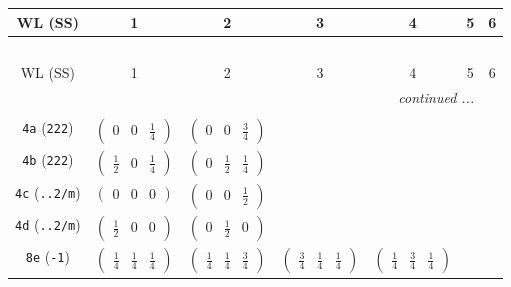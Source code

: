\documentclass[fleqn,9pt,landscape]{jsarticle}
\begin{document}
\begin{center}
\renewcommand{\arraystretch}{1.2}
\begin{longtable}{ccccccc}
 \hline \hline
WL (SS) & 1 & 2 & 3 & 4 & 5 & 6 \\ \hline \endfirsthead

\multicolumn{6}{l}{\tablename\ \thetable{}} \\
 \hline \hline
WL (SS) & 1 & 2 & 3 & 4 & 5 & 6 \\ \hline \endhead

 \hline \hline
\multicolumn{6}{r}{\footnotesize\it continued ...} \\ \endfoot

 \hline \hline
\multicolumn{6}{r}{} \\ \endlastfoot

{\tt 4a} ({\tt 222}) & $ \begin{pmatrix} 0 & 0 & \frac{1}{4} \end{pmatrix} $ & $ \begin{pmatrix} 0 & 0 & \frac{3}{4} \end{pmatrix} $ & $  $ & $  $ & $  $ & $  $ \\ \hline
{\tt 4b} ({\tt 222}) & $ \begin{pmatrix} \frac{1}{2} & 0 & \frac{1}{4} \end{pmatrix} $ & $ \begin{pmatrix} 0 & \frac{1}{2} & \frac{1}{4} \end{pmatrix} $ & $  $ & $  $ & $  $ & $  $ \\ \hline
{\tt 4c} ({\tt ..2/m}) & $ \begin{pmatrix} 0 & 0 & 0 \end{pmatrix} $ & $ \begin{pmatrix} 0 & 0 & \frac{1}{2} \end{pmatrix} $ & $  $ & $  $ & $  $ & $  $ \\ \hline
{\tt 4d} ({\tt ..2/m}) & $ \begin{pmatrix} \frac{1}{2} & 0 & 0 \end{pmatrix} $ & $ \begin{pmatrix} 0 & \frac{1}{2} & 0 \end{pmatrix} $ & $  $ & $  $ & $  $ & $  $ \\ \hline
{\tt 8e} ({\tt -1}) & $ \begin{pmatrix} \frac{1}{4} & \frac{1}{4} & \frac{1}{4} \end{pmatrix} $ & $ \begin{pmatrix} \frac{1}{4} & \frac{1}{4} & \frac{3}{4} \end{pmatrix} $ & $ \begin{pmatrix} \frac{3}{4} & \frac{1}{4} & \frac{1}{4} \end{pmatrix} $ & $ \begin{pmatrix} \frac{1}{4} & \frac{3}{4} & \frac{1}{4} \end{pmatrix} $ & $  $ & $  $ \\ \hline

\end{longtable}
\end{center}
\end{document}
